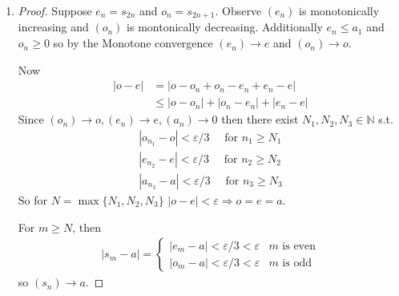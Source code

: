 \begin{enumerate}[label=(\alph*)]
    We now proceed with the proof of the alternating series test using the NIP.
    \begin{proof}
        Observe $(e_n)$ is monotonically increasing and $(o_n)$ is montonically decreasing.
        So we can choose intervals $I_n= [e_n, o_n]$. The length of an interval is given by
        \begin{align*}
            |I_n| = |o_n-e_n| = |a_{n+1}| < \varepsilon
        \end{align*}
        for $n \geq N$. These intervals are nested because of the previous lemma so by
        the NIP $x \in \cap_n I_n$.
        So
        \begin{align*}
            |s_n - x| = \begin{cases}
                |e_n - x| \leq |e_n - o_n| < \varepsilon & n \text{ is even} \\
                |o_n - x| \leq |e_n - o_n| < \varepsilon & n \text{ is odd}
            \end{cases}
        \end{align*}
    \end{proof}

    \item 
    \begin{proof}
        Suppose $e_n=s_{2n}$ and $o_n=s_{2n+1}$.
        Observe $(e_n)$ is monotonically increasing and $(o_n)$ is montonically decreasing.
        Additionally $e_n \leq a_1$ and $o_n \geq 0$ so by the Monotone convergence \Thm
        $(e_n)\rightarrow e$ and $(o_n)\rightarrow o$.
        
        Now
        \begin{align*}
            |o-e| &= |o-o_n + o_n - e_n + e_n -e| \\
                &\leq |o-o_n| + |o_n - e_n| + |e_n -e|
        \end{align*}
        Since $(o_n)\rightarrow o, (e_n)\rightarrow e, (a_n)\rightarrow 0$ then 
        there exist $N_1, N_2, N_3 \in \mathbb{N}$ s.t.
        \begin{gather*}
            |o_{n_1} - o| < \varepsilon/3 \quad \text{ for } n_1 \geq N_1 \\
            |e_{n_2} - e| < \varepsilon/3 \quad \text{ for } n_2 \geq N_2 \\
            |a_{n_3} - a| < \varepsilon/3 \quad \text{ for } n_3 \geq N_3
        \end{gather*} 
        So for $N = \max\{ N_1, N_2, N_3 \}$ $|o-e| < \varepsilon \Rightarrow o=e=a$.

        For $m \geq N$, then
        \begin{align*}
            |s_m - a| = \begin{cases}
                |e_m - a| < \varepsilon/3 < \varepsilon & m \text{ is even} \\
                |o_m - a| < \varepsilon/3 < \varepsilon & m \text{ is odd}
            \end{cases}
        \end{align*}
        so $(s_n) \rightarrow a$.
    \end{proof}
\end{enumerate}

